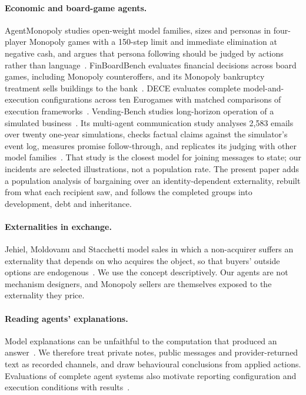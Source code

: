 \paragraph{Economic and board-game agents.} AgentMonopoly studies open-weight model families, sizes and personas in four-player Monopoly games with a 150-step limit and immediate elimination at negative cash, and argues that persona following should be judged by actions rather than language~\cite{wu2026agentmonopoly}. FinBoardBench evaluates financial decisions across board games, including Monopoly counteroffers, and its Monopoly bankruptcy treatment sells buildings to the bank~\cite{hu2026finboardbench}. DECE evaluates complete model-and-execution configurations across ten Eurogames with matched comparisons of execution frameworks~\cite{zhang2026dece}. Vending-Bench studies long-horizon operation of a simulated business~\cite{backlund2025vendingbench}. Its multi-agent communication study analyses 2,583 emails over twenty one-year simulations, checks factual claims against the simulator's event log, measures promise follow-through, and replicates its judging with other model families~\cite{li2026arena}. That study is the closest model for joining messages to state; our incidents are selected illustrations, not a population rate. The present paper adds a population analysis of bargaining over an identity-dependent externality, rebuilt from what each recipient saw, and follows the completed groups into development, debt and inheritance.

\paragraph{Externalities in exchange.} Jehiel, Moldovanu and Stacchetti model sales in which a non-acquirer suffers an externality that depends on who acquires the object, so that buyers' outside options are endogenous~\cite{jehiel1996nuclear}. We use the concept descriptively. Our agents are not mechanism designers, and Monopoly sellers are themselves exposed to the externality they price.

\paragraph{Reading agents' explanations.} Model explanations can be unfaithful to the computation that produced an answer~\cite{turpin2023unfaithful,lanham2023faithfulness}. We therefore treat private notes, public messages and provider-returned text as recorded channels, and draw behavioural conclusions from applied actions. Evaluations of complete agent systems also motivate reporting configuration and execution conditions with results~\cite{kapoor2026hal}.

